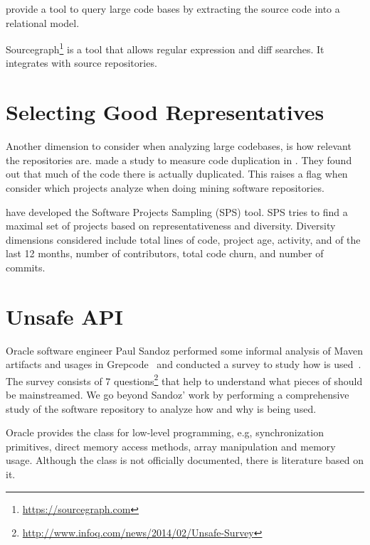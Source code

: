 \cite{bajracharyaSourcererInternetscaleSoftware2009} provide a tool to query large code bases by extracting the source code into a relational model.

Sourcegraph\footnote{\url{https://sourcegraph.com}} is a tool that allows regular expression and diff searches.
It integrates with source repositories.

\section{Selecting Good Representatives}
\label{sec:lr:selection}

Another dimension to consider when analyzing large codebases, is how relevant the repositories are.
\cite{lopesDeJaVuMapCode2017} made a study to measure code duplication in \github{}.
They found out that much of the code there is actually duplicated.
This raises a flag when consider which projects analyze when doing mining software repositories.

\cite{nagappanDiversitySoftwareEngineering2013} have developed the Software Projects Sampling (SPS) tool.
SPS tries to find a maximal set of projects based on representativeness and diversity.
Diversity dimensions considered include total lines of code, project age, activity, and of the last 12 months, number of contributors, total code churn, and number of commits.


\section{Unsafe API}
\label{sec:lr:unsafe}

Oracle software engineer Paul Sandoz 
performed some informal analysis of Maven artifacts and usages in Grepcode~\cite{sandoz-personal-communication}
and conducted a survey to study how \unsafe{} is used~\cite{psandoz14}.
The survey consists of 7 questions\footnote{\url{http://www.infoq.com/news/2014/02/Unsafe-Survey}} 
that help to understand what pieces of \smu{} should be mainstreamed.
We go beyond Sandoz' work
by performing a comprehensive study of the \mavencentral{} software repository to analyze how and why \smu{} is being used.

Oracle provides the \smu{} class for low-level programming, e.g, synchronization primitives, direct memory access methods, array manipulation and memory usage.
Although the \smu{} class is not officially documented, there is literature based on it.


